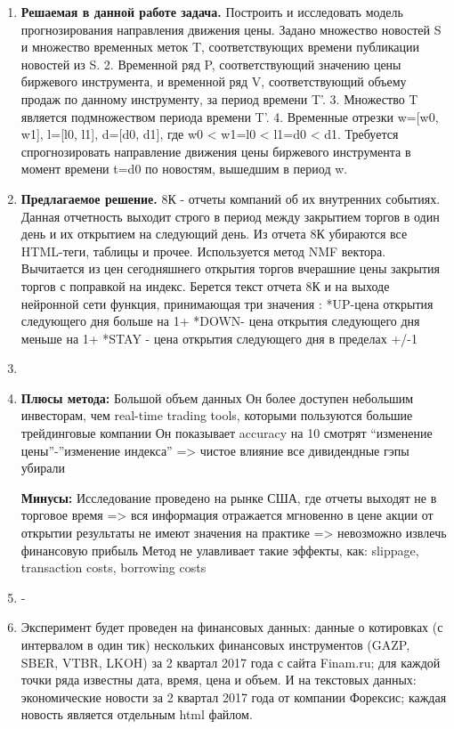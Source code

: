 \documentclass[12pt, twoside]{article}
\begin{document}
\begin{enumerate}
\item \textbf{Решаемая в данной работе задача.}
Построить и исследовать модель прогнозирования направления движения цены. Задано множество новостей S и множество временных меток T, соответствующих времени публикации новостей из S. 2. Временной ряд P, соответствующий значению цены биржевого инструмента, и временной ряд V, соответствующий объему продаж по данному инструменту, за период времени T'. 3. Множество T является подмножеством периода времени T'. 4. Временные отрезки w=[w0, w1], l=[l0, l1], d=[d0, d1], где w0 < w1=l0 < l1=d0 < d1. Требуется спрогнозировать направление движения цены биржевого инструмента в момент времени t=d0 по новостям, вышедшим в период w.

\item \textbf{Предлагаемое решение.}
8К - отчеты компаний об их внутренних событиях. Данная отчетность выходит строго в период между закрытием торгов в один день и их открытием на следующий день.
Из отчета 8К убираются все HTML-теги, таблицы и прочее.
Используется метод NMF вектора.
Вычитается из цен сегодняшнего открытия торгов вчерашние цены закрытия торгов с поправкой на индекс.
Берется текст отчета 8К и на выходе нейронной сети функция, принимающая три значения :
*UP-цена открытия следующего дня больше на 1+%
*DOWN- цена открытия следующего дня меньше на 1+%
*STAY - цена открытия следующего дня в пределах +/-1%

\item \href{https://drive.google.com/file/d/12KsFJNEADfXYLlV0Ler19A1E9N1pGa3-/view?usp=sharing}{\color{blue}{Работа, описывающая наиболее близкое решение}} 

\item \textbf{Плюсы метода:}
Большой объем данных
Он более доступен небольшим инвесторам, чем real-time trading tools, которыми пользуются большие трейдинговые компании
Он показывает accuracy на 10%
смотрят “изменение цены”-”изменение индекса” => чистое влияние
все дивидендные гэпы убирали 

\textbf{Минусы:}
Исследование проведено на рынке США, где отчеты выходят не в торговое время => вся информация отражается мгновенно в цене акции от открытии
результаты не имеют значения на практике => невозможно извлечь финансовую прибыль
Метод не улавливает такие эффекты, как: slippage, transaction costs, borrowing costs

\item -
\item Эксперимент будет проведен на финансовых данных: данные о котировках (с интервалом в один тик) нескольких финансовых инструментов (GAZP, SBER, VTBR, LKOH) за 2 квартал 2017 года с сайта Finam.ru; для каждой точки ряда известны дата, время, цена и объем. И на текстовых данных: экономические новости за 2 квартал 2017 года от компании Форексис; каждая новость является отдельным html файлом.
\end{enumerate}
\end{document}
